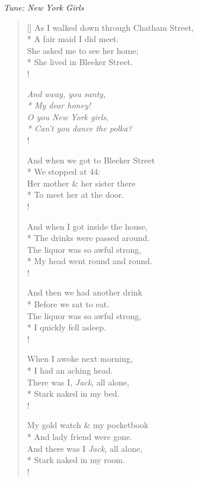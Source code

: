 \documentclass[MAIN]{subfiles}
\begin{document}
\bigskip

\begin{center}
{\it Tune: New York Girls}
\end{center}

\bigskip

\begin{verse}[\versewidth]
As I walked down through {\sc Chatham Street},\\*
\vin A fair maid I did meet.\\
She asked me to see her home;\\*
\vin She lived in {\sc Bleeker Street}.\\!

{\it And away, you santy,\\*
\vin My dear honey!\\
O you {\sc New York} girls,\\*
\vin Can't you dance the polka?}\\!

And when we got to {\sc Bleeker Street}\\*
\vin We stopped at 44:\\
Her mother \& her sister there\\*
\vin To meet her at the door.\\!

And when I got inside the house,\\*
\vin The drinks were passed around.\\
The liquor was so awful strong,\\*
\vin My head went round and round.\\!

And then we had another drink\\*
\vin Before we sat to eat.\\
The liquor was so awful strong,\\*
\vin I quickly fell asleep.\\!

When I awoke next morning,\\*
\vin I had an aching head.\\
There was I, \emph{Jack}, all alone,\\*
\vin Stark naked in my bed.\\!

My gold watch \& my pocketbook\\*
\vin And lady friend were gone.\\
And there was I \emph{Jack}, all alone,\\*
\vin Stark naked in my room.\\!


\end{verse}
\end{document}
